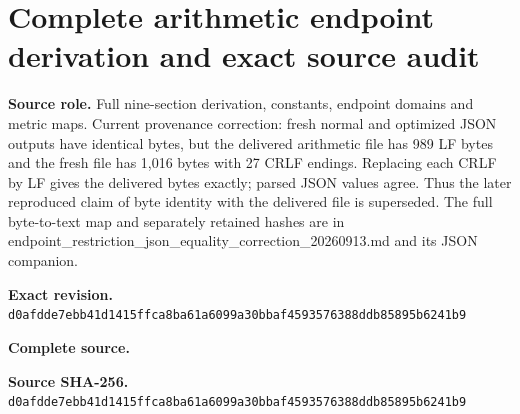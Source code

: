 \begingroup
\sloppy
\small
\section{Complete arithmetic endpoint derivation and exact source audit}
\noindent\textbf{Source role.} Full nine-section derivation, constants, endpoint domains and metric maps. Current provenance correction: fresh normal and optimized JSON outputs have identical bytes, but the delivered arithmetic file has 989 LF bytes and the fresh file has 1,016 bytes with 27 CRLF endings. Replacing each CRLF by LF gives the delivered bytes exactly; parsed JSON values agree. Thus the later reproduced claim of byte identity with the delivered file is superseded. The full byte-to-text map and separately retained hashes are in endpoint\_restriction\_json\_equality\_correction\_20260913.md and its JSON companion.\par
\noindent\textbf{Exact revision.} \nolinkurl{d0afdde7ebb41d1415ffca8ba61a6099a30bbaf4593576388ddb85895b6241b9}\par
\noindent\textbf{Complete source.} \par
\noindent\textbf{Source SHA-256.} \nolinkurl{d0afdde7ebb41d1415ffca8ba61a6099a30bbaf4593576388ddb85895b6241b9}\par\medskip

\endgroup
